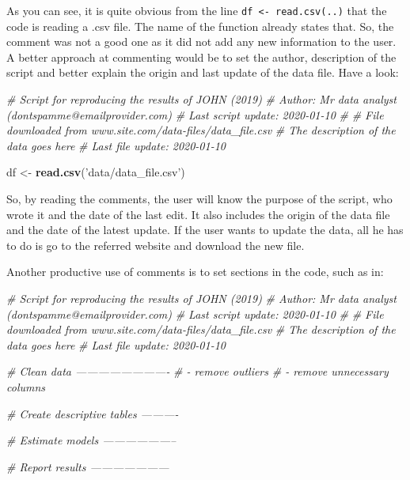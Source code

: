 \documentclass[
  12pt,
]{book}
\newenvironment{Shaded}{\begin{snugshade}}{\end{snugshade}}
\newcommand{\CommentTok}[1]{\textcolor[rgb]{0.37,0.37,0.37}{\textit{#1}}}
\newcommand{\KeywordTok}[1]{\textcolor[rgb]{0.27,0.27,0.27}{\textbf{#1}}}
\newcommand{\NormalTok}[1]{#1}
\newcommand{\StringTok}[1]{\textcolor[rgb]{0.5,0.5,0.5}{#1}}
\begin{document}
As you can see, it is quite obvious from the line \texttt{df\ \textless{}-\ read.csv(\textquotesingle{}..\textquotesingle{})} that the code is reading a .csv file. The name of the function already states that. So, the comment was not a good one as it did not add any new information to the user. A better approach at commenting would be to set the author, description of the script and better explain the origin and last update of the data file. Have a look:

\begin{Shaded}
\begin{Highlighting}[]
\CommentTok{# Script for reproducing the results of JOHN (2019)}
\CommentTok{# Author: Mr data analyst (dontspamme@emailprovider.com)}
\CommentTok{# Last script update: 2020-01-10}
\CommentTok{#}
\CommentTok{# File downloaded from www.site.com/data-files/data_file.csv}
\CommentTok{# The description of the data goes here}
\CommentTok{# Last file update: 2020-01-10}

\NormalTok{df <-}\StringTok{ }\KeywordTok{read.csv}\NormalTok{(}\StringTok{'data/data_file.csv'}\NormalTok{)}
\end{Highlighting}
\end{Shaded}

So, by reading the comments, the user will know the purpose of the script, who wrote it and the date of the last edit. It also includes the origin of the data file and the date of the latest update. If the user wants to update the data, all he has to do is go to the referred website and download the new file.

Another productive use of comments is to set sections in the code, such as in:

\begin{Shaded}
\begin{Highlighting}[]
\CommentTok{# Script for reproducing the results of JOHN (2019)}
\CommentTok{# Author: Mr data analyst (dontspamme@emailprovider.com)}
\CommentTok{# Last script update: 2020-01-10}
\CommentTok{#}
\CommentTok{# File downloaded from www.site.com/data-files/data_file.csv}
\CommentTok{# The description of the data goes here}
\CommentTok{# Last file update: 2020-01-10}

\CommentTok{# Clean data -------------------------}
\CommentTok{# - remove outliers}
\CommentTok{# - remove unnecessary columns}

\CommentTok{# Create descriptive tables ----------}


\CommentTok{# Estimate models --------------------}


\CommentTok{# Report results ---------------------}
\end{Highlighting}
\end{Shaded}
\end{document}
